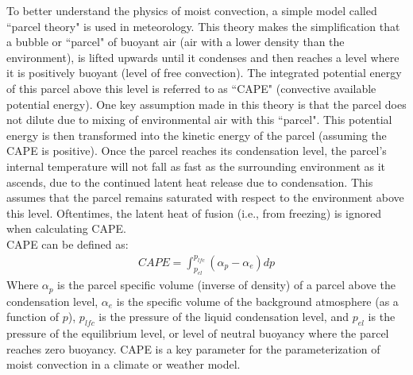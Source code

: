 \documentclass[letterpaper,12pt,titlepage,oneside,final]{book}
\begin{document}
To better understand the physics of moist convection, a simple model called ``parcel theory" is used in meteorology. This theory makes the simplification that a bubble or ``parcel" of buoyant air (air with a lower density than the environment), is lifted upwards until it condenses and then reaches a level where it is positively buoyant (level of free convection). The integrated potential energy of this parcel above this level is referred to as ``CAPE" (convective available potential energy). One key assumption made in this theory is that the parcel does not dilute due to mixing of environmental air with this ``parcel". This potential energy is then transformed into the kinetic energy of the parcel (assuming the CAPE is positive). Once the parcel reaches its condensation level, the parcel's internal temperature will not fall as fast as the surrounding environment as it ascends, due to the continued latent heat release due to condensation. This assumes that the parcel remains saturated with respect to the environment above this level. Oftentimes, the latent heat of fusion (i.e., from freezing) is ignored when calculating CAPE.
\\
CAPE can be defined as: 
\begin{align}
CAPE=\int_{p_{el}}^{p_{lfc}}(\alpha_{p}-\alpha_{e}){dp}
\end{align}
Where $\alpha_{p}$ is the parcel specific volume (inverse of density) of a parcel above the condensation level, $\alpha_{e}$ is the specific volume of the background atmosphere (as a function of $p$), $p_{lfc}$ is the pressure of the liquid condensation level, and $p_{el}$ is the pressure of the equilibrium level, or level of neutral buoyancy where the parcel reaches zero buoyancy. CAPE is a key parameter for the parameterization of moist convection in a climate or weather model.
\end{document}
